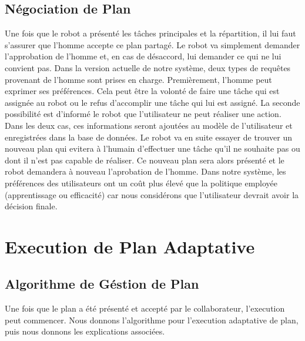\documentclass[a4paper,11pt,twoside]{StyleThese}
\begin{document}
\subsection{Négociation de Plan}
Une fois que le robot a présenté les tâches principales et la répartition, il lui faut s'assurer que l'homme accepte ce plan partagé. Le robot va simplement demander l'approbation de l'homme et, en cas de désaccord, lui demander ce qui ne lui convient pas.
Dans la version actuelle de notre système, deux types de requêtes provenant de l'homme sont prises en charge. Premièrement, l'homme peut exprimer ses préférences. Cela peut être la volonté de faire une tâche qui est assignée au robot ou le refus d'accomplir une tâche qui lui est assigné. La seconde possibilité est d'informé le robot que l'utilisateur ne peut réaliser une action. Dans les deux cas, ces informations seront ajoutées au modèle de l'utilisateur et enregistrées dans la base de données. Le robot va en suite essayer de trouver un nouveau plan qui evitera à l'humain d'effectuer une tâche qu'il ne souhaite pas ou dont il n'est pas capable de réaliser. Ce nouveau plan sera alors présenté et le robot demandera à nouveau l'aprobation de l'homme. Dans notre système, les préférences des utilisateurs ont un coût plus élevé que la politique employée (apprentissage ou efficacité) car nous considérons que l'utilisateur devrait avoir la décision finale.


\section{Execution de Plan Adaptative}
\label{planExecution}

\subsection{Algorithme de Géstion de Plan}
\label{sec:algo}
Une fois que le plan a été présenté et accepté par le collaborateur, l'execution peut commencer. Nous donnons l'algorithme pour l'execution adaptative de plan, puis nous donnons les explications associées.
\end{document}
